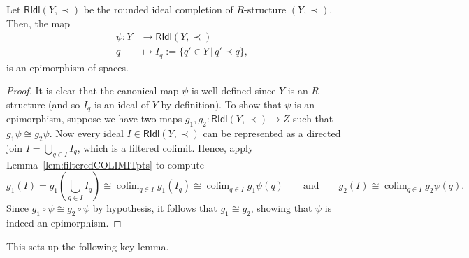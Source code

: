 \documentclass[a4paper, 11pt,reqno]{amsart}
\newcommand{\RIdl}{\mathsf{RIdl}}
\DeclareMathOperator*{\colim}{colim}
\begin{document}
\begin{lemma}\label{lem:EPIridl} Let $\RIdl(Y,\prec)$ be the rounded ideal completion of $R$-structure $(Y,\prec)$. Then, the map
	\begin{align}\label{eq:CANONridlMAP}
	\psi\colon Y &\longrightarrow \RIdl(Y,\prec) \\ 
	q&\longmapsto  I_q:=\{q'\in Y\,|\, q'\prec q\},\nonumber 
	\end{align}
is an epimorphism of spaces.
\end{lemma}
\begin{proof} It is clear that the canonical map $\psi$ is well-defined since $Y$ is an $R$-structure (and so $I_q$ is an ideal of $Y$ by definition). To show that $\psi$ is an epimorphism, suppose we have two maps $g_1,g_2\colon \RIdl(Y,\prec)\rightarrow Z$ such that $g_1 \psi\cong g_2\psi$. Now every ideal $I\in \RIdl(Y,\prec)$ can be represented as a directed join $I=\bigcup_{q\in I} I_q$, which is a filtered colimit. Hence, apply Lemma~\ref{lem:filteredCOLIMITpts} to compute
	\[g_1(I)=g_1(\displaystyle\bigcup_{q\in I} I_q) \cong \displaystyle\colim_{q\in I}g_1(I_q)\cong \displaystyle\colim_{q\in I}g_1 \psi(q)\qquad \text{and}\qquad g_2(I)\cong \displaystyle\colim_{q\in I}g_2\psi(q). \]
	Since $g_1\circ  \psi \cong  g_2 \circ \psi$ by hypothesis, it follows that $g_1\cong g_2$, showing that $\psi$ is indeed an epimorphism.
\end{proof}

This sets up the following key lemma. 
\end{document}

